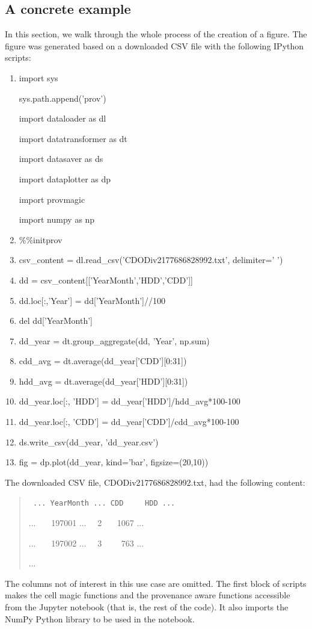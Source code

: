 \subsection{A concrete example}
In this section, we walk through the whole process of the creation of a figure. The figure was generated based on a downloaded CSV file with the following IPython scripts:
\begin{enumerate}
	\item\noindent import sys
	
	\noindent sys.path.append('prov')
	
	\noindent import dataloader as dl
	
	\noindent import datatransformer as dt
	
	\noindent import datasaver as ds
	
	\noindent import dataplotter as dp
	
	\noindent import provmagic
	
	\noindent import numpy as np
	\item \%\%initprov
	\item csv\_content = dl.read\_csv('CDODiv2177686828992.txt', delimiter=' ')
	\item dd = csv\_content[['YearMonth','HDD','CDD']]
	\item dd.loc[:,'Year'] = dd['YearMonth']//100
	\item del dd['YearMonth']
	\item dd\_year = dt.group\_aggregate(dd, 'Year', np.sum)
	\item cdd\_avg = dt.average(dd\_year['CDD'][0:31])
	\item hdd\_avg = dt.average(dd\_year['HDD'][0:31])
	\item dd\_year.loc[:, 'HDD'] = dd\_year['HDD']/hdd\_avg*100-100
	\item dd\_year.loc[:, 'CDD'] = dd\_year['CDD']/cdd\_avg*100-100
	\item ds.write\_csv(dd\_year, 'dd\_year.csv')
	\item fig = dp.plot(dd\_year, kind='bar', figsize=(20,10))
\end{enumerate}
The downloaded CSV file, CDODiv2177686828992.txt, had the following content:
\begin{quotation}\tt
	\noindent ... YearMonth ... CDD \ \ \ \ HDD ...
	 
	\noindent ... \ \ \ 197001 ... \ \ 2 \ \ \ 1067 ...
	 
	\noindent ... \ \ \ 197002 ... \ \ 3 \ \ \ \ 763 ...
	
	\noindent ... 
\end{quotation}
The columns not of interest in this use case are omitted. The first block of scripts makes the cell magic functions and the provenance aware functions accessible from the Jupyter notebook (that is, the rest of the code). It also imports the NumPy Python library to be used in the notebook.

